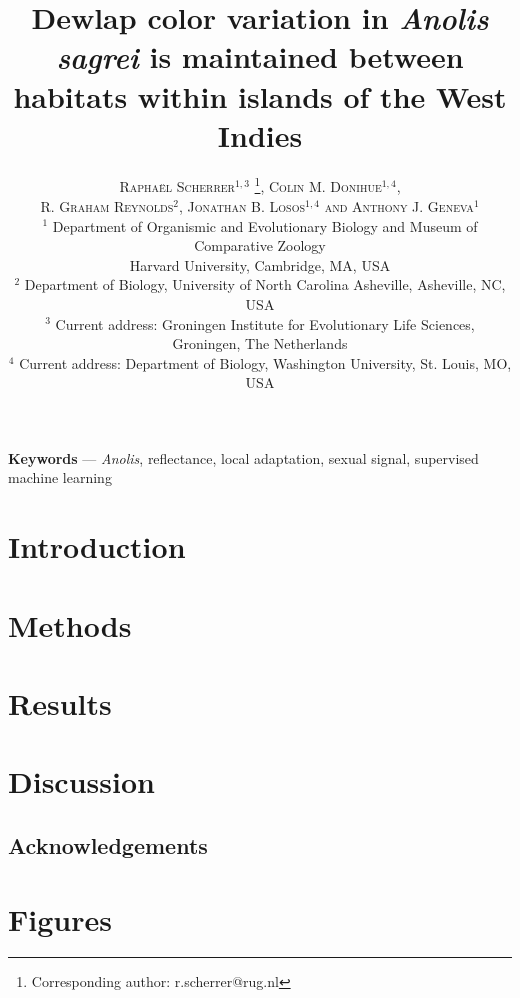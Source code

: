 \documentclass{article}
\title{Dewlap color variation in \textit{Anolis sagrei} is maintained between habitats within islands of the West Indies}
\author{
    \textsc{Rapha\"{e}l Scherrer$^{1,3}$ \thanks{Corresponding author: r.scherrer@rug.nl}, Colin M. Donihue$^{1,4}$, }\\
	\textsc{R. Graham Reynolds$^2$, Jonathan B. Losos$^{1,4}$ and Anthony J. Geneva$^1$} \\[1ex]
	\normalsize $^1$ Department of Organismic and Evolutionary Biology and Museum of Comparative Zoology \\ \normalsize Harvard University, Cambridge, MA, USA \\
	\normalsize $^2$ Department of Biology, University of North Carolina Asheville, Asheville, NC, USA\\ %
	\normalsize $^3$ Current address: Groningen Institute for Evolutionary Life Sciences,\\
	\normalsize Groningen, The Netherlands\\
	\normalsize $^4$ Current address: Department of Biology, Washington University, St. Louis, MO, USA\\
}
\date{} %
\begin{document}
	
\linenumbers
	
\maketitle

\begin{abstract}
    
\end{abstract}

\textbf{Keywords} --- \textit{Anolis}, reflectance, local adaptation, sexual signal, supervised machine learning

\section*{Introduction}

\begin{table}
	
\end{table}
	

	
\section*{Methods}


	
\section*{Results}



\section*{Discussion}


	
\subsection*{Acknowledgements}


	
\pagebreak

\section*{Figures}


\end{document}
